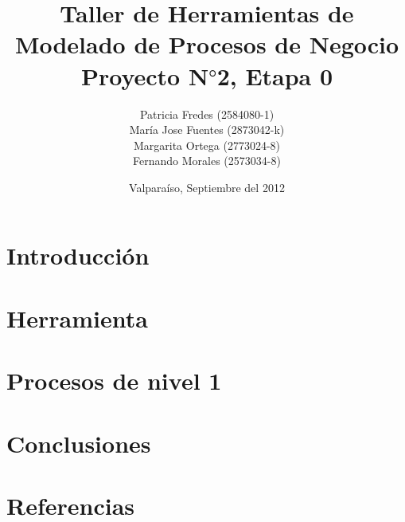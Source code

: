 \documentclass[10pt,letterpaper]{article}
\title{Taller de Herramientas de Modelado de Procesos de Negocio \\ Proyecto N$°$2, Etapa 0}
\author{Patricia Fredes (2584080-1) \\ María Jose Fuentes (2873042-k) \\ Margarita Ortega (2773024-8) \\ Fernando Morales (2573034-8)}
\date{\vspace*{1cm} Valparaí­so, Septiembre del 2012}
\begin{document}
\maketitle
\thispagestyle{empty}
\newpage
\tableofcontents

\makeatother

\newpage

\section{Introducción}


\section{Herramienta}


\section{Procesos de nivel 1}


\section{Conclusiones}





\section{Referencias}
 
\end{document}
